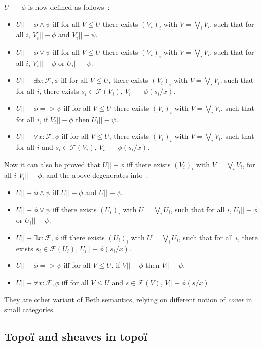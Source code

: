 \documentclass[11pt]{article}
\newcommand{\0}{\mathbf{0}}
\newcommand{\1}{\mathbf{1}}
\begin{document}
$U ||- \phi$ is now defined as follows~:
\begin{itemize}
    \item $U ||- \phi \wedge \psi$ iff for all $V \leq U$ there exists $(V_i)_i$ with $V = \bigvee_i V_i$, such that for all $i$, $V_i ||- \phi$ and $V_i ||- \psi $.
    \item $U ||- \phi \vee \psi $ iff for all $V \leq U$ there exists $(V_i)_i$ with $V = \bigvee_i V_i$, such that for all $i$, $V_i ||- \phi$ or $U_i ||- \psi $.
    \item $U ||- \exists x : \mathcal{F}, \phi $ iff for all $V\leq U$, there exists $(V_i)_i$ with $V = \bigvee_i V_i$, such that for all $i$, there exists $s_i\in \mathcal{F}(V_i)$, $V_i ||- \phi(s_i/x)$.
    \item $U ||- \phi => \psi $ iff for all $V \leq U$ there exists $(V_i)_i$ with $V = \bigvee_i V_i$, such that for all $i$, if $V_i ||- \phi$ then $U_i ||- \psi $.
    \item $U ||- \forall x : \mathcal{F}, \phi $ iff for all $V\leq U$, there exists $(V_i)_i$ with $V = \bigvee_i V_i$, such that for all $i$ and $s_i\in \mathcal{F}(V_i)$, $V_i ||- \phi(s_i/x)$.
\end{itemize}
Now it can also be proved that $U ||- \phi$ iff there exists $(V_i)_i$ with $V = \bigvee_i V_i$, for all $i$ $V_i||- \phi$, and the above degenerates into~:
\begin{itemize}
    \item $U ||- \phi \wedge \psi$ iff $U ||- \phi$ and $U ||- \psi $.
    \item $U ||- \phi \vee \psi $ iff there exists $(U_i)_i$ with $U = \bigvee_i U_i$, such that for all $i$, $U_i ||- \phi$ or $U_i ||- \psi $.
    \item $U ||- \exists x : \mathcal{F}, \phi $ iff there exists $(U_i)_i$ with $U = \bigvee_i U_i$, such that for all $i$, there exists $s_i\in \mathcal{F}(U_i)$, $U_i ||- \phi(s_i/x)$.
    \item $U ||- \phi => \psi $ iff for all $V \leq U$, if $V ||- \phi$ then $V ||- \psi $.
    \item $U ||- \forall x : \mathcal{F}, \phi $ iff for all $V\leq U$ and $s\in \mathcal{F}(V)$, $V ||- \phi(s/x)$.
\end{itemize}

They are other variant of Beth semantics, relying on different notion of \emph{cover} in small categories.

\subsection{Topoï and sheaves in topoï}\label{topoi}
\end{document}
